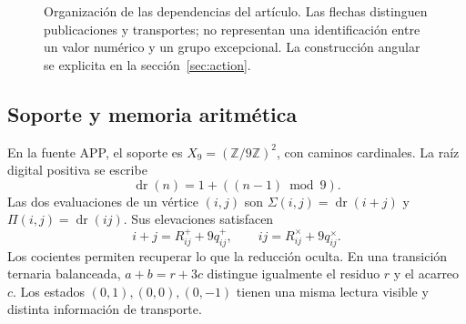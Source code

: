 \documentclass[11pt,a4paper]{article}
\numberwithin{equation}{section}
\theoremstyle{definition}
\newcommand{\HMT}{\mathrm{HMT}}
\newcommand{\Z}{\mathbb Z}
\begin{document}
\begin{figure}[htbp]
\centering
{}
\caption{Organización de las dependencias del artículo. Las flechas distinguen
publicaciones y transportes; no representan una identificación entre un valor
numérico y un grupo excepcional. La construcción angular se explicita en la sección~\ref{sec:action}.}
\end{figure}
\FloatBarrier

\subsection{Soporte y memoria aritmética}
En la fuente APP, el soporte es $X_9=(\Z/9\Z)^2$, con caminos cardinales.
La raíz digital positiva se escribe
\[
\operatorname{dr}(n)=1+((n-1)\bmod9).
\]
Las dos evaluaciones de un vértice $(i,j)$ son
$\Sigma(i,j)=\operatorname{dr}(i+j)$ y
$\Pi(i,j)=\operatorname{dr}(ij)$. Sus elevaciones satisfacen
\[
i+j=R^+_{ij}+9q^+_{ij},
\qquad
ij=R^\times_{ij}+9q^\times_{ij}.
\]
Los cocientes permiten recuperar lo que la reducción oculta. En una
transición ternaria balanceada, $a+b=r+3c$ distingue igualmente el residuo
$r$ y el acarreo $c$. Los estados $(0,1),(0,0),(0,-1)$ tienen una misma
lectura visible y distinta información de transporte.
\end{document}
